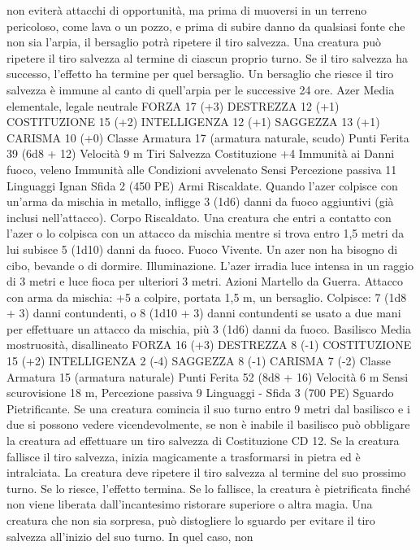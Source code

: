 \begin{multicols}{2}
non eviterà attacchi di opportunità, ma prima di muoversi in un
terreno pericoloso, come lava o un pozzo, e prima di subire
danno da qualsiasi fonte che non sia l’arpia, il bersaglio potrà
ripetere il tiro salvezza. Una creatura può ripetere il tiro salvezza
al termine di ciascun proprio turno. Se il tiro salvezza ha
successo, l’effetto ha termine per quel bersaglio.
Un bersaglio che riesce il tiro salvezza è immune al canto di
quell’arpia per le successive 24 ore.
Azer
Media elementale, legale neutrale
FORZA 17 (+3)
DESTREZZA 12 (+1)
COSTITUZIONE 15 (+2)
INTELLIGENZA 12 (+1)
SAGGEZZA 13 (+1)
CARISMA 10 (+0)
Classe Armatura 17 (armatura naturale, scudo)
Punti Ferita 39 (6d8 + 12)
Velocità 9 m
Tiri Salvezza Costituzione +4
Immunità ai Danni fuoco, veleno
Immunità alle Condizioni avvelenato
Sensi Percezione passiva 11
Linguaggi Ignan
Sfida 2 (450 PE)
Armi Riscaldate. Quando l’azer colpisce con un’arma da mischia
in metallo, infligge 3 (1d6) danni da fuoco aggiuntivi (già inclusi
nell’attacco).
Corpo Riscaldato. Una creatura che entri a contatto con l’azer o
lo colpisca con un attacco da mischia mentre si trova entro 1,5
metri da lui subisce 5 (1d10) danni da fuoco.
Fuoco Vivente. Un azer non ha bisogno di cibo, bevande o di
dormire.
Illuminazione. L’azer irradia luce intensa in un raggio di 3 metri
e luce fioca per ulteriori 3 metri.
Azioni
Martello da Guerra. Attacco con arma da mischia: +5 a colpire,
portata 1,5 m, un bersaglio.
Colpisce: 7 (1d8 + 3) danni contundenti, o 8 (1d10 + 3) danni
contundenti se usato a due mani per effettuare un attacco da
mischia, più 3 (1d6) danni da fuoco.
Basilisco
Media mostruosità, disallineato
FORZA 16 (+3)
DESTREZZA 8 (-1)
COSTITUZIONE 15 (+2)
INTELLIGENZA 2 (-4)
SAGGEZZA 8 (-1)
CARISMA 7 (-2)
Classe Armatura 15 (armatura naturale)
Punti Ferita 52 (8d8 + 16)
Velocità 6 m
Sensi scurovisione 18 m, Percezione passiva 9
Linguaggi -
Sfida 3 (700 PE)
Sguardo Pietrificante. Se una creatura comincia il suo turno entro 9
metri dal basilisco e i due si possono vedere vicendevolmente, se non
è inabile il basilisco può obbligare la creatura ad effettuare un tiro
salvezza di Costituzione CD 12. Se la creatura fallisce il tiro
salvezza, inizia magicamente a trasformarsi in pietra ed è intralciata.
La creatura deve ripetere il tiro salvezza al termine del suo prossimo
turno. Se lo riesce, l’effetto termina. Se lo fallisce, la creatura è
pietrificata finché non viene liberata dall’incantesimo ristorare
superiore o altra magia.
Una creatura che non sia sorpresa, può distogliere lo sguardo per
evitare il tiro salvezza all’inizio del suo turno. In quel caso, non

\end{multicols}
